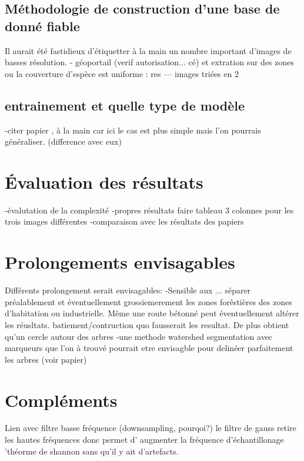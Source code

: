 \documentclass{article}
\begin{document}
	\subsection{Méthodologie de construction d'une base de donné fiable}
		Il aurait été fastidieux d'étiquetter à la main un nombre important d'images de basses résolution.   
		- géoportail (verif autorisation... cé) et extration sur des zones ou la couverture d'espèce est uniforme : res --- images triées en 2
	
	\subsection{entrainement et quelle type de modèle }
		-citer papier , à la main car ici le cas est plus simple mais l'on pourrais généraliser. (difference avec eux)

\section{\'{E}valuation des résultats}
	-évalutation de la complexité 
	-propres résultats
	faire tableau 3 colonnes pour les trois images différentes
	-comparaison avec les résultats des papiers 

\section{Prolongements envisagables}

	Différents prolongement serait envisagables: 
	-Sensible aux ... séparer préalablement et éventuellement grossiemerement les zones forêstières des zones d'habitation ou  industrielle. Même une route bétonné peut éventuellement altérer les réusltats. batiement/contruction quo fausserait les resultat. 
	De plus obtient qu'un cercle autour des arbres
	-une methode watershed segmentation avec marqueurs que l'on à trouvé pourrait etre envisagble pour delinéer parfaitement les arbres (voir papier) 

	
\nocite{NatesanResNet} %



\appendix

	\section{Compléments}
		Lien avec filtre basse fréquence (downsampling, pourqoi?)
		le filtre de gauss retire les hautes fréquences donc permet d' augmenter la fréquence d'échantillonage 'théorme de shannon sans qu'il y ait d'artefacts. 
	
\end{document}
